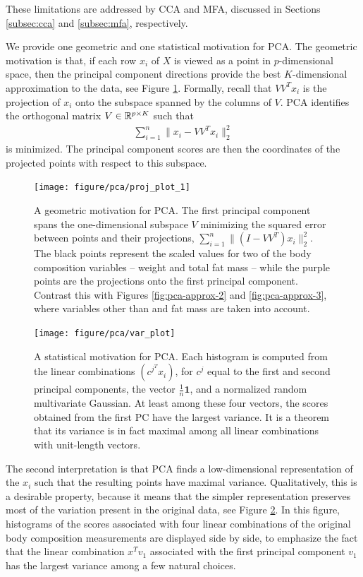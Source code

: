 \documentclass{article}
\begin{document}
These limitations are addressed by CCA and MFA, discussed in Sections
\ref{subsec:cca} and \ref{subsec:mfa}, respectively.

We provide one geometric and one statistical motivation for PCA. The geometric
motivation is that, if each row $x_{i}$ of $X$ is viewed as a point in
$p$-dimensional space, then the principal component directions provide the best
$K$-dimensional approximation to the data, see Figure \ref{fig:pca-approx}.
Formally, recall that $VV^{T}x_{i}$ is the projection of $x_{i}$ onto the
subspace spanned by the columns of $V$. PCA identifies the orthogonal matrix $V
\in \mathbb{R}^{p \times K}$ such that
\begin{align*}
\sum_{i = 1}^{n}\|x_{i} - VV^{T} x_{i}\|_{2}^{2}
\end{align*}
is minimized. The principal component scores are then the coordinates of the
projected points with respect to this subspace.

\begin{figure}
  \centering
  \texttt{[image: figure/pca/proj\_plot\_1]}
  \caption{A geometric motivation for PCA. The first principal component spans
    the one-dimensional subspace $V$ minimizing the squared error between points
    and their projections, $\sum_{i = 1}^{n}\|\left(I -
    VV^{T}\right)x_{i}\|_{2}^{2}$. The black points represent the scaled values
    for two of the body composition variables -- weight and total fat mass --
    while the purple points are the projections onto the first principal
    component. Contrast this with Figures \ref{fig:pca-approx-2} and
    \ref{fig:pca-approx-3}, where variables other than and fat mass are taken
    into account.}
  \label{fig:pca-approx}
\end{figure}

\begin{figure}
  \centering
  \texttt{[image: figure/pca/var\_plot]}
  \caption{A statistical motivation for PCA. Each histogram is computed from the
    linear combinations $\left(c^{j^{T}}x_{i}\right)$, for $c^{j}$ equal
    to the first and second principal components, the vector
    $\frac{1}{n}\mathbf{1}$, and a normalized random multivariate Gaussian. At
    least among these four vectors, the scores obtained from the first PC have
    the largest variance. It is a theorem that its variance is in fact maximal
    among all linear combinations with unit-length vectors.}
  \label{fig:pca-var}
\end{figure}

The second interpretation is that PCA finds a low-dimensional representation of
the $x_{i}$ such that the resulting points have maximal variance. Qualitatively,
this is a desirable property, because it means that the simpler representation
preserves most of the variation present in the original data, see Figure
\ref{fig:pca-var}. In this figure, histograms of the scores associated with four
linear combinations of the original body composition measurements are displayed
side by side, to emphasize the fact that the linear combination $x^{T}v_{1}$
associated with the first principal component $v_{1}$ has the largest variance
among a few natural choices.
\end{document}
